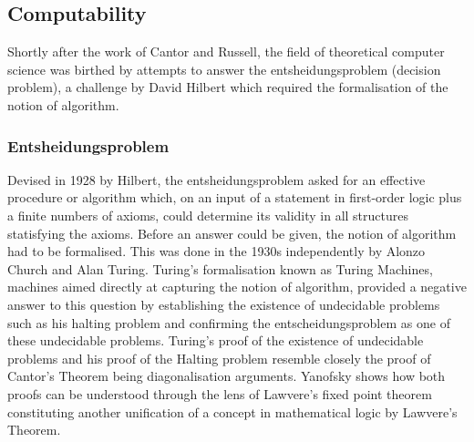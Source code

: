 \subsection{Computability}
Shortly after the work of Cantor and Russell, the field of theoretical computer
science was birthed by attempts to answer the entsheidungsproblem (decision
problem), a challenge by David Hilbert \cite{hilbert1928theoretische} which required the formalisation of the
notion of algorithm.

\subsubsection{Entsheidungsproblem}

Devised in 1928 by Hilbert, the entsheidungsproblem asked for an effective
procedure or algorithm which, on an input of a statement in first-order logic
plus a finite numbers of axioms, could determine its validity in all structures
statisfying the axioms. Before an answer could be given, the notion of algorithm
had to be formalised. This was done in the 1930s independently by Alonzo Church
and Alan Turing. Turing's formalisation
\cite{turing1937computable} known as Turing Machines, machines aimed directly at
capturing the notion of algorithm, provided a negative answer to this question
by establishing the existence of undecidable problems such as his halting
problem and confirming the entscheidungsproblem as one of these undecidable
problems.  Turing's proof of the existence of undecidable problems and his proof
of the Halting problem resemble closely the proof of Cantor's Theorem being
diagonalisation arguments. Yanofsky shows how both proofs can be understood
through the lens of Lawvere's fixed point theorem constituting another
unification of a concept in mathematical logic by Lawvere's Theorem.

